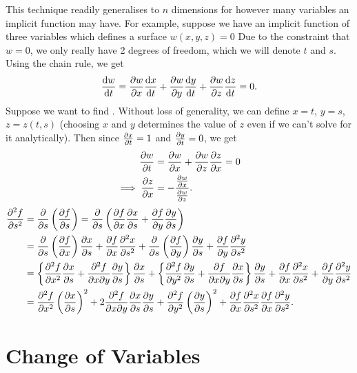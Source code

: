 \documentclass[../multivariate_calculus.tex]{subfiles}
\begin{document}
        This technique readily generalises to $n$ dimensions for however many variables an implicit function may have.
        For example, suppose we have an implicit function of three variables which defines a surface $w(x,y,z)=0$
        Due to the constraint that $w=0$, we only really have 2 degrees of freedom, which we will denote $t$ and $s$.
        Using the chain rule, we get
        \begin{equation}
            \frac{\mathrm{d}w}{\mathrm{d}t}=\frac{\partial w}{\partial x}\frac{\mathrm{d}x}{\mathrm{d}t}+\frac{\partial w}{\partial y}\frac{\mathrm{d}y}{\mathrm{d}t}+\frac{\partial w}{\partial z}\frac{\mathrm{d}z}{\mathrm{d}t}=0.
        \end{equation}
        Suppose we want to find .
        Without loss of generality, we can define $x=t$, $y=s$, $z=z(t,s)$ (choosing $x$ and $y$ determines the value of $z$ even if we can't solve for it analytically).
        Then since $\frac{\partial x}{\partial t}=1$ and $\frac{\partial y}{\partial t}=0$, we get
        \begin{align}
            \frac{\partial w}{\partial t}&=\frac{\partial w}{\partial x}+\frac{\partial w}{\partial z}\frac{\partial z}{\partial x}=0\\
            \implies\frac{\partial z}{\partial x}&=-\frac{\frac{\partial w}{\partial x}}{\frac{\partial w}{\partial z}}.
        \end{align}
        \begin{align}
            \frac{\partial^2{f}}{\partial{s}^2}&=\frac{\partial}{\partial s}\left(\frac{\partial f}{\partial s}\right)=\frac{\partial}{\partial s}\left(\frac{\partial f}{\partial x}\frac{\partial x}{\partial s}+\frac{\partial f}{\partial y}\frac{\partial y}{\partial s}\right)\\
            &=\frac{\partial}{\partial s}\left(\frac{\partial f}{\partial x}\right)\frac{\partial x}{\partial s}+\frac{\partial f}{\partial x}\frac{\partial^2{x}}{\partial{s}^2}+\frac{\partial}{\partial s}\left(\frac{\partial f}{\partial y}\right)\frac{\partial y}{\partial s}+\frac{\partial f}{\partial y}\frac{\partial^2{y}}{\partial{s}^2}\\
            &=\left\{\frac{\partial^2{f}}{\partial{x}^2}\frac{\partial x}{\partial s}+\frac{\partial^2 f}{\partial x\partial y}\frac{\partial y}{\partial s}\right\}\frac{\partial x}{\partial s}+\left\{\frac{\partial^2{f}}{\partial{y}^2}\frac{\partial y}{\partial s}+\frac{\partial f}{\partial x\partial y}\frac{\partial x}{\partial s}\right\}\frac{\partial y}{\partial s}+\frac{\partial f}{\partial x}\frac{\partial^2{x}}{\partial{s}^2}+\frac{\partial f}{\partial y}\frac{\partial^2{y}}{\partial{s}^2}\\
            &=\frac{\partial^2{f}}{\partial{x}^2}\left(\frac{\partial x}{\partial s}\right)^2+2\frac{\partial^2 f}{\partial x\partial y}\frac{\partial x}{\partial s}\frac{\partial y}{\partial s}+\frac{\partial^2{f}}{\partial{y}^2}\left(\frac{\partial y}{\partial s}\right)^2+\frac{\partial f}{\partial x}\frac{\partial^2{x}}{\partial{s}^2}\frac{\partial f}{\partial x}\frac{\partial^2{y}}{\partial{s}^2}.
        \end{align}

    \section{Change of Variables}
\end{document}
